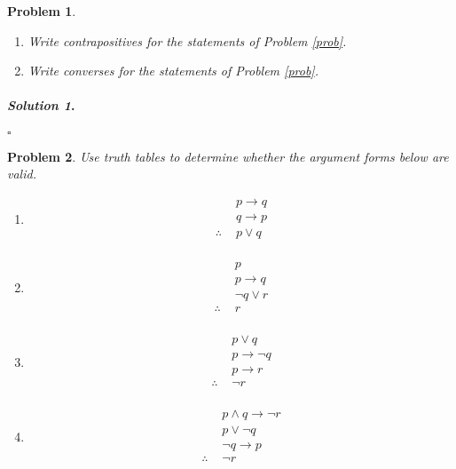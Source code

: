 \documentclass{amsart}
\theoremstyle{plain}
\newtheorem{problem}{Problem}
\newenvironment{solution}{\paragraph{\emph{Solution 1}.}}{\hfill$\square$}
\begin{document}
\begin{problem}
\hfill
\begin{enumerate}
\item Write contrapositives for the statements of Problem \ref{prob}.
\item Write converses for the statements of Problem \ref{prob}.
\end{enumerate}
\end{problem}
\begin{solution}
\end{solution}

\begin{problem}
Use truth tables to determine whether the argument forms below are valid.
\begin{enumerate}
\item
\begin{equation*}
\begin{aligned}
& \,\,p \to q \\
& \,\,q \to p \\
\therefore & \,\, p \lor q \\
\end{aligned}
\end{equation*}
\item
\begin{equation*}
\begin{aligned}
& \,\,p  \\
& \,\, p \to q \\
& \,\, \neg q \lor r \\
\therefore & \,\,  r \\
\end{aligned}
\end{equation*}
\item
\begin{equation*}
\begin{aligned}
& \,\,p \lor q \\
& \,\, p \to \neg q \\
& \,\, p \to r \\
\therefore & \,\, \neg r \\
\end{aligned}
\end{equation*}
\item
\begin{equation*}
\begin{aligned}
& \,\,p \land q \to \neg r  \\
& \,\, p \lor \neg q \\
& \,\, \neg q \to p \\
\therefore & \,\, \neg r \\
\end{aligned}
\end{equation*}
\end{enumerate}
\end{problem}
\end{document}
